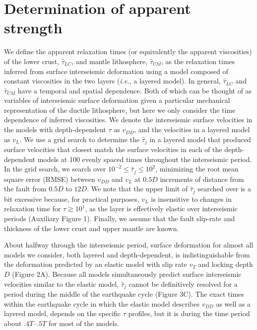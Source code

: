 \section{Determination of apparent strength}
We define the apparent relaxation times (or equivalently the apparent viscosities) of the lower crust, $\hat{\tau}_{LC}$, and mantle lithosphere, $\hat{\tau}_{UM}$, as the relaxation times inferred from surface interseismic deformation using a model composed of constant viscosities in the two layers ({\it i.e.}, a layered model). In general, $\hat{\tau}_{LC}$ and $\hat{\tau}_{UM}$ have a temporal \citep{Riva2009} and spatial \citep{Yamasaki2012} dependence.  Both of which can be thought of as variables of interseismic surface deformation given a particular mechanical representation of the ductile lithosphere, but here we only consider the time dependence of inferred viscosities.  We denote the interseismic surface velocities in the models with depth-dependent $\tau$ as $v_{DD}$, and the velocities in a layered model as $v_{L}$.  We use a grid search to determine the $\hat{\tau}_j$ in a layered model that produced surface velocities that closest match the surface velocities in each of the depth-dependent models at 100 evenly spaced times throughout the interseismic period.  In the grid search, we search over $10^{-2} \leq \hat{\tau}_j \leq 10^2$, minimizing the root mean square error (RMSE) between $v_{DD}$ and $v_L$ at $0.5D$ increments of distance from the fault from $0.5D$ to $12D$\@.  We note that the upper limit of $\hat{\tau}_j$ searched over is a bit excessive because, for practical purposes, $v_{L}$ is insensitive to changes in relaxation time for $\tau \gtrsim 10^1$, as the layer is effectively elastic over interseismic periods \citep{Savage1978} (Auxiliary Figure 1).  Finally, we assume that the fault slip-rate and thickness of the lower crust and upper mantle are known.

About halfway through the interseismic period, surface deformation for almost all models we consider, both layered and depth-dependent, is indistinguishable from the deformation predicted by an elastic model with slip rate $v_T$ and locking depth $D$ \citep{Savage1973a} (Figure 2A). Because all models simultaneously predict surface interseismic velocities similar to the elastic model, $\hat{\tau}_j$ cannot be definitively resolved for a period during the middle of the earthquake cycle (Figure 3C). The exact times within the earthquake cycle in which the elastic model describes $v_{DD}$ as well as a layered model, depends on the specific $\tau$ profiles, but it is during the time period about $.4T$--$.5T$ for most of the models. 


